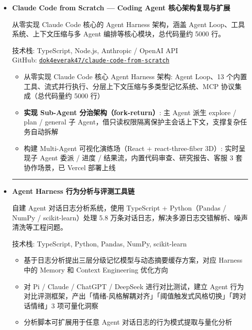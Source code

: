 \documentclass[zh]{resume}
\begin{document}
\begin{itemize}
    \item[\faCode] \textbf{Claude Code from Scratch — Coding Agent 核心架构复现与扩展}

    从零实现 Claude Code 核心的 Agent Harness 架构，涵盖 Agent Loop、工具系统、上下文压缩与多 Agent 编排等核心模块，总代码量约 5000 行。

    技术栈: TypeScript, Node.js, Anthropic / OpenAI API \\
    GitHub: \href{https://github.com/dok4everak47/claude-code-from-scratch}{\texttt{dok4everak47/claude-code-from-scratch}}
    \begin{itemize}
        \item 从零实现 Claude Code 核心 Agent Harness 架构: Agent Loop、13 个内置工具、流式并行执行、分层上下文压缩与多类型记忆系统、MCP 协议集成（总代码量约 5000 行）
        \item \textbf{实现 Sub-Agent 分治架构（fork-return）}: 主 Agent 派生 explore / plan / general 子 Agent，借只读权限隔离保护主会话上下文，支撑复杂任务自动拆解
        \item 构建 Multi-Agent 可视化演练场（React + react-three-fiber 3D）: 实时呈现子 Agent 委派 / 进度 / 结果流，内置代码审查、研究报告、客服 3 套协作场景，已 Vercel 部署上线
    \end{itemize}

    \vspace{0.6ex}
    {\color{accentcolor!15}\hrule}
    \vspace{0.6ex}

    \item[\faCode] \textbf{Agent Harness 行为分析与评测工具链}

    自建 Agent 对话日志分析系统，使用 TypeScript + Python（Pandas / NumPy / scikit-learn）处理 5.8 万条对话日志，解决多源日志交错解析、噪声清洗等工程问题。

    技术栈: TypeScript, Python, Pandas, NumPy, scikit-learn
    \begin{itemize}
        \item 基于日志分析提出三层分级记忆模型与动态摘要缓存方案，对应 Harness 中的 Memory 和 Context Engineering 优化方向
        \item 对 Pi / Claude / ChatGPT / DeepSeek 进行对比测试，建立 Agent 行为对比评测框架，产出「情绪-风格解耦对齐」「阈值触发式风格切换」「跨对话情绪」3 项可量化洞察
        \item 分析脚本可扩展用于任意 Agent 对话日志的行为模式提取与量化分析
    \end{itemize}


\end{itemize}
\end{document}
